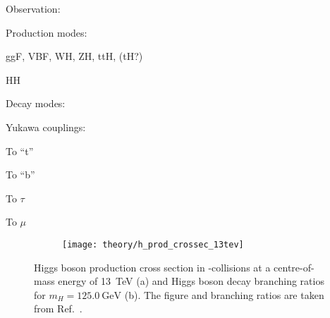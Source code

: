 Observation:






Production modes:

ggF, VBF, WH, ZH, ttH, (tH?)

HH

Decay modes:






Yukawa couplings:

To ``t''

To ``b''

To $\tau$

To $\mu$



\begin{figure}[htbp]
  \centering

  \begin{subfigure}[b]{0.47\textwidth}
    \centering

    \texttt{[image: theory/h\_prod\_crossec\_13tev]}

  \end{subfigure}\hfill%
  \begin{subfigure}[b]{0.47\textwidth}
    \centering

    \renewcommand{\arraystretch}{1.1}%
    

  \end{subfigure}

  \caption{Higgs boson production cross section in \pp-collisions at a
    centre-of-mass energy of \SI{13}{\TeV} (a) and Higgs boson decay branching
    ratios for $m_{H} = \SI{125.0}{\GeV}$ (b). The figure and branching ratios
    are taken from Ref.~\cite{deFlorian:2016spz}.}
\end{figure}





